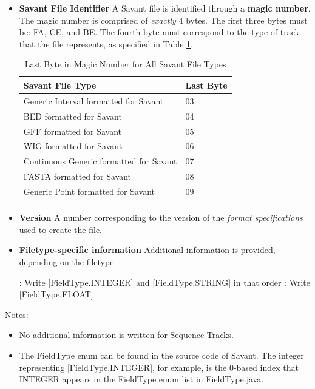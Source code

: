 \documentclass{report}
\begin{document}
\begin{itemize}
\item{} {\bf Savant File Identifier} A Savant file is identified through a {\bf magic number}. The magic number is comprised of {\it exactly} 4 bytes. The first three bytes must be: FA, CE, and BE. The fourth byte must correspond to the type of track that the file represents, as specified in Table \ref{bytetable}.

\begin{table}[h] 
\caption{Last Byte in Magic Number for All Savant File Types}  
\begin{tabular*}{6in}{ l l }  
\hline                      
Savant File Type & Last Byte \\
\hline                    
Generic Interval formatted for Savant & 03 \\
BED formatted for Savant & 04 \\
GFF formatted for Savant & 05 \\
WIG formatted for Savant & 06 \\
Continuous Generic formatted for Savant & 07 \\
FASTA formatted for Savant &  08 \\
Generic Point formatted for Savant & 09 \\
\hline     
\label{bytetable}
\end{tabular*} 
\end{table} 

\item{} {\bf Version} A number corresponding to the version of the {\it format specifications} used to create the file.

\item{} {\bf Filetype-specific information} Additional information is provided, depending on the filetype:

: Write [FieldType.INTEGER] and [FieldType.STRING] in that order
: Write [FieldType.FLOAT]
\end{itemize}

Notes:
\begin{itemize}
\item{} No additional information is written for Sequence Tracks.
\item{} The FieldType enum can be found in the source code of Savant. The integer representing [FieldType.INTEGER], for example, is the 0-based index that INTEGER appears in the FieldType enum list in FieldType.java.
\end{itemize}
\end{document}
